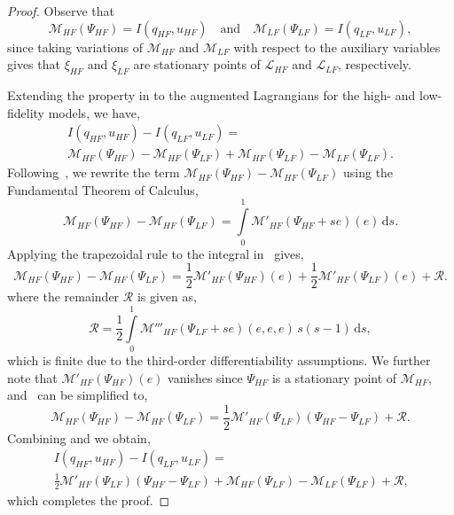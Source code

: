 \begin{proof}
%
Observe that
%
\begin{equation}
\label{eq:MeqI}
\mathcal{M}_{HF}(\Psi_{HF})=I(q_{HF},u_{HF})\quad\textrm{and}\quad\mathcal{M}_{LF}(\Psi_{LF})=I(q_{LF},u_{LF}),
\end{equation}
%
since taking variations of $\mathcal{M}_{HF}$ and $\mathcal{M}_{LF}$ with respect to the auxiliary variables gives that $\xi_{HF}$ and $\xi_{LF}$ are stationary points of $\mathcal{L}_{HF}$ and $\mathcal{L}_{LF}$, respectively.

Extending the property in  to the augmented Lagrangians for the high- and low-fidelity models, we have,
%
\begin{multline}
\label{eq:repIwithM}
I(q_{HF},u_{HF})-I(q_{LF},u_{LF})=\\\mathcal{M}_{HF}(\Psi_{HF})-\mathcal{M}_{HF}(\Psi_{LF})+\mathcal{M}_{HF}(\Psi_{LF})-\mathcal{M}_{LF}(\Psi_{LF})\textrm{.}
\end{multline}
%
Following~\cite{BecVex05}, we rewrite the term $\mathcal{M}_{HF}(\Psi_{HF})-\mathcal{M}_{HF}(\Psi_{LF})$ using the Fundamental Theorem of Calculus,
%
\begin{equation}
\label{eq:Mantiderivative}
\mathcal{M}_{HF}(\Psi_{HF})-\mathcal{M}_{HF}(\Psi_{LF}) = \int\limits_{0}^{1} \mathcal{M}'_{HF}\left(\Psi_{HF} + se\right)\left(e\right) \, \textrm{d}s.
\end{equation}
%
Applying the trapezoidal rule to the integral in~ gives,
%
\begin{equation}
\label{eq:Mprimetrapezoid}
\mathcal{M}_{HF}(\Psi_{HF})-\mathcal{M}_{HF}(\Psi_{LF}) = \frac{1}{2}\mathcal{M}'_{HF}(\Psi_{HF})(e) + \frac{1}{2}\mathcal{M}'_{HF}(\Psi_{LF})(e) + \mathcal{R}\textrm{.}
\end{equation}
%
where the remainder $\mathcal{R}$ is given as,
%
\begin{equation}
\label{eq:trapezoidremainder}
\mathcal{R} = \frac{1}{2} \int\limits_{0}^{1} \mathcal{M}'''_{HF}\left(\Psi_{LF} + se\right)(e,e,e) \, s(s-1) \, \textrm{d}s,
\end{equation}
%
which is finite due to the third-order differentiability assumptions. We further note that $\mathcal{M}'_{HF}(\Psi_{HF})(e)$ vanishes since $\Psi_{HF}$ is a stationary point of $\mathcal{M}_{HF}$, and~ can be simplified to,
%
\begin{equation}
\label{eq:beckvex}
\mathcal{M}_{HF}(\Psi_{HF})-\mathcal{M}_{HF}(\Psi_{LF}) = \frac{1}{2}\mathcal{M}'_{HF}(\Psi_{LF})(\Psi_{HF}-\Psi_{LF})+\mathcal{R}\textrm{.}
\end{equation}
%
Combining  and  we obtain,
%
\begin{multline}
\label{eq:preadj}
I(q_{HF},u_{HF})-I(q_{LF},u_{LF})=\\\frac{1}{2}\mathcal{M}'_{HF}(\Psi_{LF})(\Psi_{HF}-\Psi_{LF})+\mathcal{M}_{HF}(\Psi_{LF})-\mathcal{M}_{LF}(\Psi_{LF})+\mathcal{R}\textrm{,}
\end{multline}
which completes the proof.
\end{proof}
%


